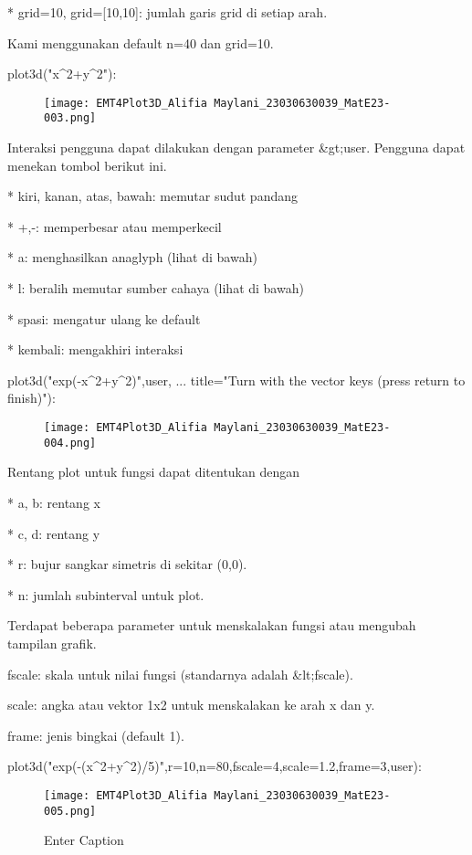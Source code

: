 \documentclass{article}
\begin{document}
* 
grid=10, grid=[10,10]: jumlah garis grid di setiap arah.


Kami menggunakan default n=40 dan grid=10.


\>plot3d("x^2+y^2"):
\begin{figure}
    \centering
    \texttt{[image: EMT4Plot3D\_Alifia Maylani\_23030630039\_MatE23-003.png]}
    \caption{}
    \label{fig:enter-label}
\end{figure}

Interaksi pengguna dapat dilakukan dengan parameter &gt;user. Pengguna
dapat menekan tombol berikut ini.


* 
kiri, kanan, atas, bawah: memutar sudut pandang

* 
+,-: memperbesar atau memperkecil

* 
a: menghasilkan anaglyph (lihat di bawah)

* 
l: beralih memutar sumber cahaya (lihat di bawah)

* 
spasi: mengatur ulang ke default

* 
kembali: mengakhiri interaksi


\>plot3d("exp(-x^2+y^2)",\>user, ...  
\>     title="Turn with the vector keys (press return to finish)"):


\begin{figure}
    \centering
    \texttt{[image: EMT4Plot3D\_Alifia Maylani\_23030630039\_MatE23-004.png]}
    \caption{}
    \label{fig:enter-label}
\end{figure}

Rentang plot untuk fungsi dapat ditentukan dengan


* 
a, b: rentang x

* 
c, d: rentang y

* 
r: bujur sangkar simetris di sekitar (0,0).

* 
n: jumlah subinterval untuk plot.


Terdapat beberapa parameter untuk menskalakan fungsi atau mengubah
tampilan grafik.


fscale: skala untuk nilai fungsi (standarnya adalah &lt;fscale).


scale: angka atau vektor 1x2 untuk menskalakan ke arah x dan y.


frame: jenis bingkai (default 1).


\>plot3d("exp(-(x^2+y^2)/5)",r=10,n=80,fscale=4,scale=1.2,frame=3,\>user):


\begin{figure}
    \centering
    \texttt{[image: EMT4Plot3D\_Alifia Maylani\_23030630039\_MatE23-005.png]}
    \caption{Enter Caption}
    \label{fig:enter-label}
\end{figure}
\end{document}
